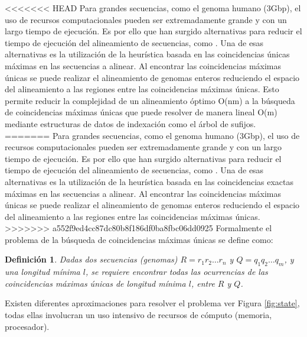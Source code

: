 \documentclass[12pt,a4paper]{article}
\newtheorem{mydef}{Definición}
\begin{document}
<<<<<<< HEAD
Para grandes secuencias, como el genoma humano (3Gbp), el uso de recursos computacionales pueden ser extremadamente grande y con un largo tiempo de ejecución. Es por ello que han surgido alternativas para reducir el tiempo de ejecución del alineamiento de secuencias, como \cite{Mongelli,Kouzinopoulos2005,Encarnac2011,Vyverman2013,OguzhanKulekci2011,Khan2009,OhlebuschGK10}. Una de esas alternativas es la utilización de la heurística basada en las coincidencias \'unicas máximas en las secuencias a alinear. Al encontrar las coincidencias máximas  únicas se puede realizar el alineamiento de genomas enteros reduciendo el espacio del alineamiento a las regiones entre las coincidencias máximas únicas. Esto permite reducir la complejidad de un alineamiento \'optimo O(nm) a la b\'usqueda de coincidencias m\'aximas \'unicas que puede resolver de manera lineal O(m) mediante estructuras de datos de indexaci\'on como el \'arbol de sufijos.\\
=======
Para grandes secuencias, como el genoma humano (3Gbp), el uso de recursos computacionales pueden ser extremadamente grande y con un largo tiempo de ejecución. Es por ello que han surgido alternativas para reducir el tiempo de ejecución del alineamiento de secuencias, como \cite{OguzhanKulekci2011,Mongelli,Kouzinopoulos2005,Encarnac2011,Vyverman2013,OguzhanKulekci2011,Khan2009,OhlebuschGK10}. Una de esas alternativas es la utilización de la heurística basada en las coincidencias exactas máximas en las secuencias a alinear. Al encontrar las coincidencias máximas  únicas se puede realizar el alineamiento de genomas enteros reduciendo el espacio del alineamiento a las regiones entre las coincidencias máximas únicas.\\
>>>>>>> a552f9ed4cc87dc80b8f186df0ba8fbc06dd0925
\indent
Formalmente el problema de la búsqueda de coincidencias máximas únicas se define como:
\begin{mydef}
  Dadas dos secuencias (genomas) $R=r_{1}r_{2}\hdots r_{n}$ y $Q=q_{1}q_{2}\hdots q_{m}$, y una longitud mínima $l$, se requiere encontrar todas las ocurrencias de las coincidencias máximas únicas de longitud mínima $l$, entre $R$ y $Q$.
\end{mydef}
Existen diferentes aproximaciones para resolver el problema ver Figura \ref{fig:state}, todas ellas involucran un uso intensivo de recursos de cómputo (memoria, procesador).
\end{document}
